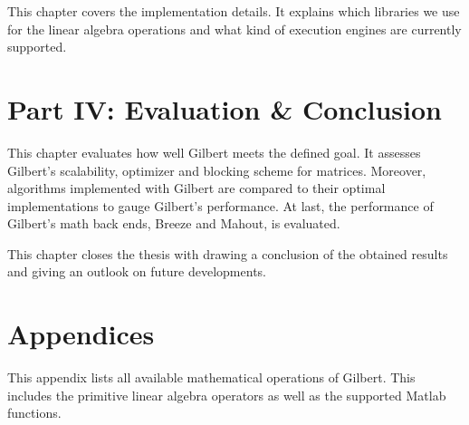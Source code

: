 \vspace{1mm}


\noindent This chapter covers the implementation details.
It explains which libraries we use for the linear algebra operations and what kind of execution engines are currently supported.

\vspace{1mm}

\section*{Part IV: Evaluation \& Conclusion}


This chapter evaluates how well Gilbert meets the defined goal.
It assesses Gilbert's scalability, optimizer and blocking scheme for matrices.
Moreover, algorithms implemented with Gilbert are compared to their optimal implementations to gauge Gilbert's performance.
At last, the performance of Gilbert's math back ends, Breeze and Mahout, is evaluated.

\vspace{1mm}


This chapter closes the thesis with drawing a conclusion of the obtained results and giving an outlook on future developments.

\vspace{1mm}

\section*{Appendices}


This appendix lists all available mathematical operations of Gilbert.
This includes the primitive linear algebra operators as well as the supported Matlab functions.